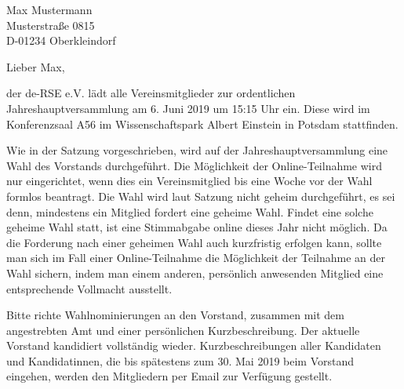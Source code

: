 \documentclass[../Vorlagen/de-RSE_Brief,a4paper]{scrlttr2}
\begin{document}

\begin{letter}{
    Max Mustermann\\
    Musterstraße 0815\\
    D-01234 Oberkleindorf
}
\opening{Lieber Max,}

der de-RSE e.V. lädt alle Vereinsmitglieder zur ordentlichen Jahreshauptversammlung am 6. Juni 2019 um 15:15 Uhr ein.
Diese wird im Konferenzsaal A56 im Wissenschaftspark Albert Einstein in Potsdam stattfinden.

Wie in der Satzung vorgeschrieben, wird auf der Jahreshauptversammlung eine Wahl des Vorstands durchgeführt.
Die Möglichkeit der Online-Teilnahme wird nur eingerichtet, wenn dies ein Vereinsmitglied bis eine Woche vor der Wahl formlos beantragt.
Die Wahl wird laut Satzung nicht geheim durchgeführt, es sei denn, mindestens ein Mitglied fordert eine geheime Wahl.
Findet eine solche geheime Wahl statt, ist eine Stimmabgabe online dieses Jahr nicht möglich.
Da die Forderung nach einer geheimen Wahl auch kurzfristig erfolgen kann, sollte man sich im Fall einer Online-Teilnahme die Möglichkeit der Teilnahme an der Wahl sichern, indem man einem anderen, persönlich anwesenden Mitglied eine entsprechende Vollmacht ausstellt.

Bitte richte Wahlnominierungen an den Vorstand, zusammen mit dem angestrebten Amt und einer persönlichen Kurzbeschreibung.
Der aktuelle Vorstand kandidiert vollständig wieder.
Kurzbeschreibungen aller Kandidaten und Kandidatinnen, die bis spätestens zum 30. Mai 2019 beim Vorstand eingehen, werden den Mitgliedern per Email zur Verfügung gestellt.


\end{letter}
\end{document}
